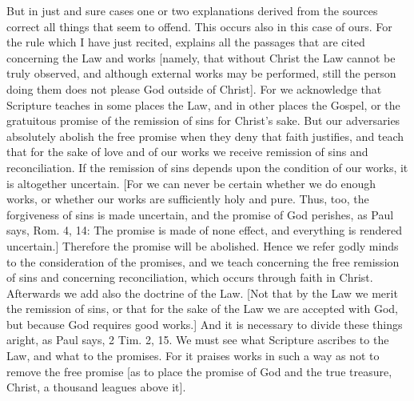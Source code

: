 But in just and sure cases one or two explanations derived from the
sources correct all things that seem to offend.  This occurs also in
this case of ours.  For the rule which I have just recited, explains
all the passages that are cited concerning the Law and works [namely,
that without Christ the Law cannot be truly observed, and although
external works may be performed, still the person doing them does not
please God outside of Christ].  For we acknowledge that Scripture
teaches in some places the Law, and in other places the Gospel, or
the gratuitous promise of the remission of sins for Christ's sake.
But our adversaries absolutely abolish the free promise when they
deny that faith justifies, and teach that for the sake of love and of
our works we receive remission of sins and reconciliation.  If the
remission of sins depends upon the condition of our works, it is
altogether uncertain.  [For we can never be certain whether we do
enough works, or whether our works are sufficiently holy and pure.
Thus, too, the forgiveness of sins is made uncertain, and the promise
of God perishes, as Paul says, Rom. 4, 14: The promise is made of
none effect, and everything is rendered uncertain.] Therefore the
promise will be abolished.  Hence we refer godly minds to the
consideration of the promises, and we teach concerning the free
remission of sins and concerning reconciliation, which occurs through
faith in Christ.  Afterwards we add also the doctrine of the Law.
[Not that by the Law we merit the remission of sins, or that for the
sake of the Law we are accepted with God, but because God requires
good works.] And it is necessary to divide these things aright, as
Paul says, 2 Tim. 2, 15. We must see what Scripture ascribes to the
Law, and what to the promises.  For it praises works in such a way as
not to remove the free promise [as to place the promise of God and
the true treasure, Christ, a thousand leagues above it].

